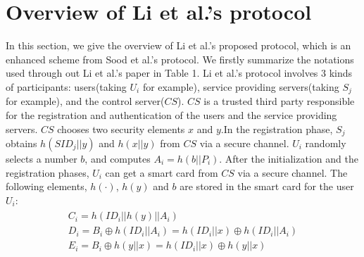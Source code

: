 \documentclass[preprint,12pt]{elsarticle}
\begin{document}
\begin{table}[!ht]
\caption{Notations used in Li et. al.'s paper}
\centering
\end{table}


\section{Overview of Li et al.'s protocol}
In this section, we give the overview of Li et al.'s proposed protocol, which is an enhanced scheme from Sood et al.'s protocol. We firstly summarize the notations used through out Li et al.'s paper in Table 1. Li et al.'s protocol involves 3 kinds of participants: users(taking $U_i$ for example), service providing servers(taking $S_j$ for example), and the control server($CS$). $CS$ is a trusted third party responsible for the registration and authentication of the users and the service providing servers. $CS$ chooses two security elements $x$ and $y$.In the registration phase, $S_j$ obtains $h(SID_j||y)$ and $h(x||y)$ from $CS$ via a secure channel. $U_i$ randomly selects a number $b$, and computes $A_i=h(b||P_i)$. After the initialization and the registration phases, $U_i$ can get a smart card from $CS$ via a secure channel. The following elements, $h(\cdot)$, $h(y)$ and $b$ are stored in the smart card for the user $U_i$:
\begin{eqnarray}
\left.\begin{array}{l}
C_i=h(ID_i||h(y)||A_i)\\
D_i=B_i\oplus h(ID_i||A_i)=h(ID_i||x)\oplus h(ID_i||A_i)\\
E_i=B_i\oplus h(y||x)=h(ID_i||x)\oplus h(y||x)
\end{array} \right.
\end{eqnarray}
\end{document}
